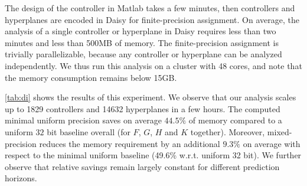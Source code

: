 The design of the controller in Matlab takes a few minutes, then controllers and
hyperplanes are encoded in Daisy for finite-precision assignment. On average, the
analysis of a single controller or hyperplane in Daisy requires less than two
minutes and less than 500MB of memory. The finite-precision assignment is trivially parallelizable, 
because any controller or hyperplane can be analyzed independently.
We thus run this analysis on a cluster with 48 cores, and note that the 
memory consumption remains below 15GB. 


\autoref{tab:di} shows the results of this experiment.
We observe that our analysis scales up to 1829 controllers and 14632 hyperplanes in a few hours.  The computed minimal uniform precision saves on average $44.5\%$ of memory
compared to a uniform $32$ bit baseline overall (for $F$, $G$, $H$ and $K$ together). 
Moreover, mixed-precision reduces the memory requirement by an additional
$9.3\%$ on average with respect to the minimal uniform baseline (49.6\% w.r.t. uniform 32 bit).
We further observe that relative savings remain largely constant for different 
prediction horizons.

